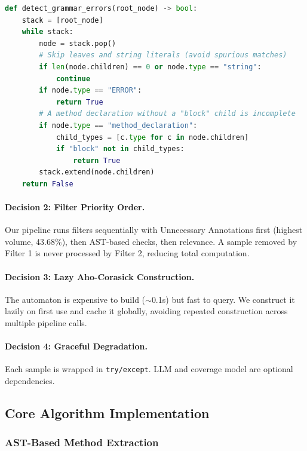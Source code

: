 \documentclass[acmlarge,nonacm,screen]{acmart}
\begin{document}
\begin{lstlisting}[language=Python,caption={Iterative AST traversal for grammar error detection}]
def detect_grammar_errors(root_node) -> bool:
    stack = [root_node]
    while stack:
        node = stack.pop()
        # Skip leaves and string literals (avoid spurious matches)
        if len(node.children) == 0 or node.type == "string":
            continue
        if node.type == "ERROR":
            return True
        # A method declaration without a "block" child is incomplete
        if node.type == "method_declaration":
            child_types = [c.type for c in node.children]
            if "block" not in child_types:
                return True
        stack.extend(node.children)
    return False
\end{lstlisting}

\paragraph{Decision 2: Filter Priority Order.}
Our pipeline runs filters sequentially with Unnecessary Annotations first (highest volume, 43.68\%), then AST-based checks, then relevance. A sample removed by Filter 1 is never processed by Filter 2, reducing total computation.

\paragraph{Decision 3: Lazy Aho-Corasick Construction.}
The automaton is expensive to build ($\sim$0.1s) but fast to query. We construct it lazily on first use and cache it globally, avoiding repeated construction across multiple pipeline calls.

\paragraph{Decision 4: Graceful Degradation.}
Each sample is wrapped in \texttt{try/except}. LLM and coverage model are optional dependencies.

\subsection{Core Algorithm Implementation}

\subsubsection{AST-Based Method Extraction}
\end{document}
